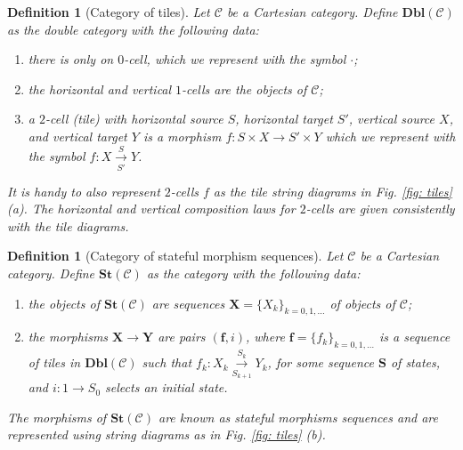 \documentclass[11pt,a4paper,openright,twoside]{report}
\newcounter{mycounter}
\theoremstyle{plain}
\newtheorem{definition}[mycounter]{Definition}
\theoremstyle{definition}
\begin{document}
\begin{definition}[Category of tiles]
  Let $\mathcal{C}$ be a Cartesian category. Define $\mathbf{Dbl}(\mathcal{C})$ as the double category with the following data:
  \begin{enumerate}
    \item there is only on $0$-cell, which we represent with the symbol $\cdot$;
    \item the horizontal and vertical $1$-cells are the objects of $\mathcal{C}$;
    \item a $2$-cell (tile) with horizontal source $S$, horizontal target $S'$, vertical source $X$, and vertical target $Y$ is a morphism $f: S \times X \to S' \times Y$ which we represent with the symbol $f:X \overset{S}{\underset{S'}\longrightarrow} Y$.
  \end{enumerate}
  It is handy to also represent $2$-cells $f$ as the tile string diagrams in \textit{Fig. \ref{fig: tiles} (a)}. The horizontal and vertical composition laws for $2$-cells are given consistently with the tile diagrams.
\end{definition}

\begin{definition}[Category of stateful morphism sequences]
  Let $\mathcal{C}$ be a Cartesian category. Define $\mathbf{St}(\mathcal{C})$ as the category with the following data:
  \begin{enumerate}
    \item the objects of $\mathbf{St}(\mathcal{C})$ are sequences $\mathbf{X} = \{X_k\}_{k = 0,1,\dots}$ of objects of $\mathcal{C}$;
    \item the morphisms $\mathbf{X} \to \mathbf{Y}$ are pairs $(\mathbf{f}, i)$, where $\mathbf{f} = \{f_k\}_{k = 0,1,\dots}$ is a sequence of tiles in $\mathbf{Dbl}(\mathcal{C})$ such that $f_k: X_k \overset{S_k}{\underset{S_{k+1}}\longrightarrow} Y_k$, for some sequence $\mathbf{S}$ of states, and $i: 1 \to S_0$ selects an initial state. 
  \end{enumerate}
  The morphisms of $\mathbf{St}(\mathcal{C})$ are known as stateful morphisms sequences and are represented using string diagrams as in \textit{Fig. \ref{fig: tiles} (b)}.
\end{definition}
\end{document}

